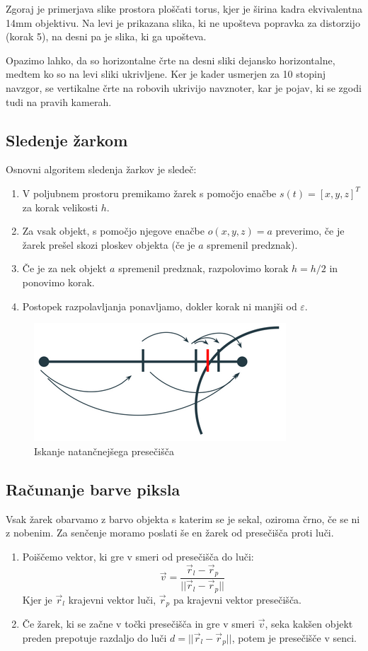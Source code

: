 \documentclass[titlepage]{article}
\begin{document}
Zgoraj je primerjava slike prostora ploščati torus, kjer je širina kadra ekvivalentna 14mm objektivu. Na levi je 
prikazana slika, ki ne upošteva popravka za distorzijo (korak 5), na desni pa je slika, ki ga upošteva.

Opazimo lahko, da so horizontalne črte na desni sliki dejansko horizontalne, medtem ko so na levi sliki 
ukrivljene. Ker je kader usmerjen za 10 stopinj navzgor, se vertikalne črte na robovih ukrivijo navznoter, 
kar je pojav, ki se zgodi tudi na pravih kamerah.


\subsection{Sledenje žarkom}
Osnovni algoritem sledenja žarkov je sledeč:

\begin{enumerate}
\item V poljubnem prostoru premikamo žarek s pomočjo enačbe \( s(t) = [x, y, z]^T \) za korak velikosti $h$.
\item Za vsak objekt, s pomočjo njegove enačbe \( o(x, y, z) = a \) preverimo, če je žarek prešel skozi ploskev 
objekta (če je \( a \) spremenil predznak).
\item Če je za nek objekt \( a \) spremenil predznak, razpolovimo korak \( h = h/2 \) in ponovimo korak.
\item Postopek razpolavljanja ponavljamo, dokler korak ni manjši od \( \varepsilon \).
\end{enumerate}

\begin{figure}[H]
  \centering
  \includegraphics[width=0.5\linewidth]{intersect.png}
  \caption{Iskanje natančnejšega presečišča}
  \label{Slika:Iskanje natančnejšega presečišča}
\end{figure}

\subsection{Računanje barve piksla}
Vsak žarek obarvamo z barvo objekta s katerim se je sekal, oziroma črno, če se ni z nobenim. Za senčenje moramo
poslati še en žarek od presečišča proti luči. 
\begin{enumerate}
  \item Poiščemo vektor, ki gre v smeri od presečišča do luči: 
  \[ \vec{v} = \frac{\vec{r}_{l} - \vec{r}_{p}}{||\vec{r}_{l} - \vec{r}_{p}||} \]
  Kjer je \( \vec{r}_{l} \) krajevni vektor luči, \( \vec{r}_{p} \) pa krajevni vektor presečišča.
\item Če žarek, ki se začne v točki presečišča in gre v smeri \( \vec{v} \), seka kakšen objekt preden 
    prepotuje razdaljo do luči 
  \( d = ||\vec{r}_{l} - \vec{r}_{p}||\), potem je presečišče v senci.
\end{enumerate}
\end{document}
